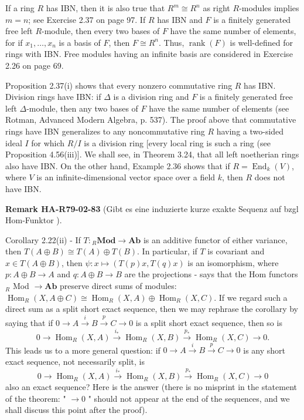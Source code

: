 \documentclass[10pt, letterpaper]{article}
\newcommand{\CustomHeading}[3]{%
  \par\medskip\noindent%
  \textbf{#1 #2} \textnormal{(#3)}.\enskip%
}
\newenvironment{REM}[2]{\begin{unitbox}\CustomHeading{Remark}{#1}{#2}}{\end{unitbox}}
\begin{document}
If a ring $R$ has IBN, then it is also true that $R^{m} \cong R^{n}$ as right $R$-modules implies $m=n$; see Exercise 2.37 on page 97. If $R$ has IBN and $F$ is a finitely generated free left $R$-module, then every two bases of $F$ have the same number of elements, for if $x_{1}, \ldots, x_{n}$ is a basis of $F$, then $F \cong R^{n}$. Thus, $\operatorname{rank}(F)$ is well-defined for rings with IBN. Free modules having an infinite basis are considered in Exercise 2.26 on page 69.


Proposition 2.37(i) shows that every nonzero commutative ring $R$ has IBN. Division rings have IBN: if $\Delta$ is a division ring and $F$ is a finitely generated free left $\Delta$-module, then any two bases of $F$ have the same number of elements (see Rotman, Advanced Modern Algebra, p. 537). The proof above that commutative rings have IBN generalizes to any noncommutative ring $R$ having a two-sided ideal $I$ for which $R / I$ is a division ring [every local ring is such a ring (see Proposition 4.56(iii)]. We shall see, in Theorem 3.24, that all left noetherian rings also have IBN. On the other hand, Example 2.36 shows that if $R=\operatorname{End}_{k}(V)$, where $V$ is an infinite-dimensional vector space over a field $k$, then $R$ does not have IBN.

\begin{REM}{HA-R79-02-83}{Gibt es eine induzierte kurze exakte Sequenz auf bzgl Hom-Funktor }
Corollary 2.22(ii) - If $T:{ }_{R} \mathbf{M o d} \rightarrow \mathbf{A b}$ is an additive functor of either variance, then $T(A \oplus B) \cong T(A) \oplus T(B)$. In particular, if $T$ is covariant and $x \in T(A \oplus B)$, then $\psi: x \mapsto(T(p) x, T(q) x)$ is an isomorphism, where $p: A \oplus B \rightarrow A$ and $q: A \oplus B \rightarrow B$ are the projections - says that the Hom functors ${ }_{R}$ Mod $\rightarrow \mathbf{A b}$ preserve direct sums of modules: $\operatorname{Hom}_{R}(X, A \oplus C) \cong \operatorname{Hom}_{R}(X, A) \oplus \operatorname{Hom}_{R}(X, C)$. If we regard such a direct sum as a split short exact sequence, then we may rephrase the corollary by saying that if $0 \rightarrow A \xrightarrow{i} B \xrightarrow{p} C \rightarrow 0$ is a split short exact sequence, then so is
$$
0 \rightarrow \operatorname{Hom}_{R}(X, A) \xrightarrow{i_{*}} \operatorname{Hom}_{R}(X, B) \xrightarrow{p_{*}} \operatorname{Hom}_{R}(X, C) \rightarrow 0 .
$$
This leads us to a more general question: if $0 \rightarrow A \xrightarrow{i} B \xrightarrow{p} C \rightarrow 0$ is any short exact sequence, not necessarily split, is
$$
0 \rightarrow \operatorname{Hom}_{R}(X, A) \xrightarrow{i_{*}} \operatorname{Hom}_{R}(X, B) \xrightarrow{p_{*}} \operatorname{Hom}_{R}(X, C) \rightarrow 0
$$
also an exact sequence? Here is the answer (there is no misprint in the statement of the theorem: " $\rightarrow 0$ " should not appear at the end of the sequences, and we shall discuss this point after the proof).
\end{REM}
\end{document}
